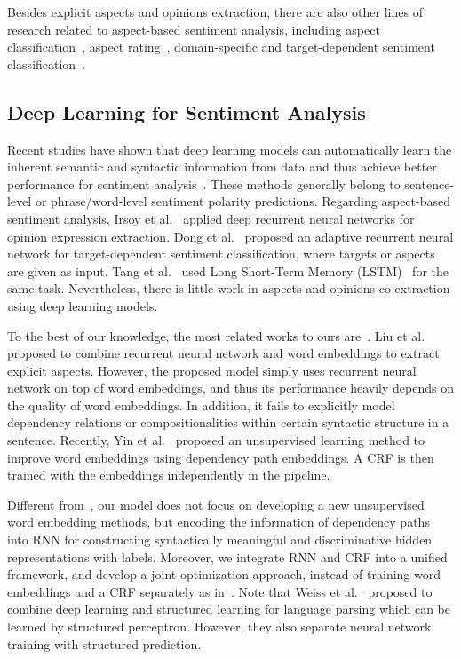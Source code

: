 \documentclass[11pt,letterpaper]{article}
\begin{document}
Besides explicit aspects and opinions extraction, there are also other lines of research related to aspect-based sentiment analysis, including aspect classification~\cite{Hima14,Julian12}, aspect rating~\cite{Ivan08,wang11,Wang14}, domain-specific and target-dependent sentiment classification~\cite{Lu11,nir16,dong14,tang15}.

\subsection{Deep Learning for Sentiment Analysis}

Recent studies have shown that deep learning models can automatically learn the inherent semantic and syntactic information from data and thus achieve better performance for sentiment analysis~\cite{Socher11b,Socher12,Socher13,Glorot11,kalch14,kim14,Le14}. These methods generally belong to sentence-level or phrase/word-level sentiment polarity predictions. Regarding aspect-based sentiment analysis, Irsoy et al.~ applied deep recurrent neural networks for opinion expression extraction. Dong et al.~ proposed an adaptive recurrent neural network for target-dependent sentiment classification, where targets or aspects are given as input. Tang et al.~ used Long Short-Term Memory (LSTM)~\cite{DBLP:journals/neco/HochreiterS97} for the same task. Nevertheless, there is little work in aspects and opinions co-extraction using deep learning models.

To the best of our knowledge, the most related works to ours are~\cite{liu15,Yin16}. Liu et al.~ proposed to combine recurrent neural network and word embeddings to extract explicit aspects. However, the proposed model simply uses recurrent neural network on top of word embeddings, and thus its performance heavily depends on the quality of word embeddings. In addition, it fails to explicitly model dependency relations or compositionalities within certain syntactic structure in a sentence. Recently, Yin et al.~ proposed an unsupervised learning method to improve word embeddings using dependency path embeddings. A CRF is then trained with the embeddings independently in the pipeline.

Different from~\cite{Yin16}, our model does not focus on developing a new unsupervised word embedding methods, but encoding the information of dependency paths into RNN for constructing syntactically meaningful and discriminative hidden representations with labels. Moreover, we integrate RNN and CRF into a unified framework, and develop a joint optimization approach, instead of training word embeddings and a CRF separately as in~\cite{Yin16}. Note that Weiss et al.~ proposed to combine deep learning and structured learning for language parsing which can be learned by structured perceptron. However, they also separate neural network training with structured prediction.
\end{document}
